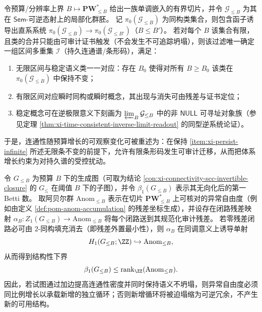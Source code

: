 \begin{conclusion}\label{con:xi-connectivity-persistent-barcode}
令预算/分辨率上界 \(B\mapsto \mathbf{PW}^{\ast}_{\le B}\) 给出一族单调嵌入的有界切片，并令 \(\mathcal{G}_{\le B}\) 为其在 \(\mathsf{Sem}\)-可逆态射上的局部化群胚。
记 \(\pi_0(\mathcal{G}_{\le B})\) 为同构类集合，则包含函子诱导出直系系统
\(
\pi_0(\mathcal{G}_{\le B})\to \pi_0(\mathcal{G}_{\le B'})
\)（\(B\le B'\)）。
若对每个 \(B\) 该集合有限，且类的合并只能由可审计证书触发（不会发生不可追踪坍塌），则该过滤唯一确定一组区间多重集 \(\mathcal I\)（持久连通谱/条形码），满足：
\begin{enumerate}
  \item 无限区间与稳定语义类一一对应：存在 \(B_0\) 使得对所有 \(B\ge B_0\) 该类在 \(\pi_0(\mathcal{G}_{\le B})\) 中保持不变；\label{item:xi-persist-infinite}
  \item 有限区间对应瞬时同构或瞬时概念，其出现与消失可由残差与证书定位；\label{item:xi-persist-finite}
  \item 稳定概念可在逆极限意义下刻画为 \(\varprojlim_B \mathcal{G}_{\le B}\) 中的非 \(\mathsf{NULL}\) 可寻址对象族（参见定理 \ref{thm:xi-time-consistent-inverse-limit-readout} 的同型逆系统论证）。\label{item:xi-persist-invlim}
\end{enumerate}
于是，连通性随预算增长的可观察变化可被重述为：在保持 \ref{item:xi-persist-infinite} 所述无限条不变的前提下，允许有限条形码发生可审计迁移，从而把体系增长约束为对持久谱的受控扰动。
\end{conclusion}

\begin{conclusion}\label{con:xi-connectivity-betti-lower-bound-by-anom-rank}
令 \(G_{\le B}\) 为预算 \(B\) 下的生成图（可取为结论 \ref{con:xi-connectivity-scc-invertible-closure} 的 \(G_{\le}\) 在阈值 \(B\) 下的子图），并令 \(\beta_1(G_{\le B})\) 表示其无向化后的第一 Betti 数。
取阿贝尔群 \(\mathrm{Anom}_{\le B}\) 表示在切片 \(\mathbf{PW}^{\ast}_{\le B}\) 上可核对的异常自由度（例如由定义 \ref{def:pom-anom-accumulation} 的残差坐标生成），并设存在闭路残差映射
\(
\alpha_B:Z_1(G_{\le B})\to \mathrm{Anom}_{\le B}
\)
将每个闭路送到其规范化审计残差。
若零残差闭路必可由 \(2\)-同构填充消去（即残差外置最小性），则 \(\alpha_B\) 在同调意义上诱导单射
\[
H_1(G_{\le B};\ZZ)\hookrightarrow \mathrm{Anom}_{\le B},
\]
从而得到结构性下界
\[
\beta_1(G_{\le B})\le \mathrm{rank}_{\ZZ}(\mathrm{Anom}_{\le B}).
\]
因此，若试图通过加边提高连通性密度并同时保持语义不坍塌，则异常自由度必须同比例增长以承载新增的独立循环；否则新增循环将被迫塌缩为可逆冗余，不产生新的可用结构。
\end{conclusion}

